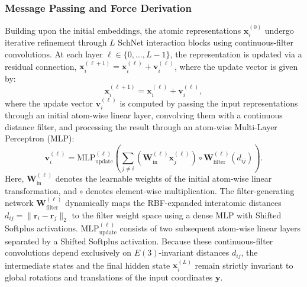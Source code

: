 \subsubsection{Message Passing and Force Derivation}
Building upon the initial embeddings, the atomic representations $\mathbf{x}_i^{(0)}$ undergo iterative refinement through $L$ SchNet interaction blocks using continuous-filter convolutions. At each layer $\ell \in \{0, \dots, L-1\}$, the representation is updated via a residual connection, $\mathbf{x}_i^{(\ell+1)} = \mathbf{x}_i^{(\ell)} + \mathbf{v}_i^{(\ell)}$, where the update vector is given by:
\begin{equation}
    \mathbf{x}_i^{(\ell+1)} = \mathbf{x}_i^{(\ell)} + \mathbf{v}_i^{(\ell)},
\end{equation}
where the update vector $\mathbf{v}_i^{(\ell)}$ is computed by passing the input representations through an initial atom-wise linear layer, convolving them with a continuous distance filter, and processing the result through an atom-wise Multi-Layer Perceptron (MLP):
\begin{equation}
    \mathbf{v}_i^{(\ell)} = \mathrm{MLP}_{\mathrm{update}}^{(\ell)} \left( \sum_{j \neq i} \left( \mathbf{W}_{\mathrm{in}}^{(\ell)} \mathbf{x}_j^{(\ell)} \right) \circ \mathbf{W}_{\mathrm{filter}}^{(\ell)}(d_{ij}) \right).
\end{equation}
Here, $\mathbf{W}_{\mathrm{in}}^{(\ell)}$ denotes the learnable weights of the initial atom-wise linear transformation, and $\circ$ denotes element-wise multiplication. The filter-generating network $\mathbf{W}_{\mathrm{filter}}^{(\ell)}$ dynamically maps the RBF-expanded interatomic distances $d_{ij} = \lVert\mathbf{r}_i - \mathbf{r}_j\rVert_2$ to the filter weight space using a dense MLP with Shifted Softplus activations. $\mathrm{MLP}_{\mathrm{update}}^{(\ell)}$ consists of two subsequent atom-wise linear layers separated by a Shifted Softplus activation. Because these continuous-filter convolutions depend exclusively on $E(3)$-invariant distances $d_{ij}$, the intermediate states and the final hidden state $\mathbf{x}_i^{(L)}$ remain strictly invariant to global rotations and translations of the input coordinates $\mathbf{y}$.


